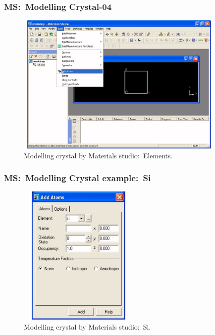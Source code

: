 \frame
{
	\frametitle{\textrm{MS:~Modelling Crystal-04}}
\begin{figure}[h!]
\centering
\vspace*{-0.10in}
\includegraphics[height=2.70in,width=4.00in,viewport=0 0 1090 759,clip]{Figures/MS-New_Project-09.png}
\caption{\tiny \textrm{Modelling crystal by Materials studio:~Elements.}}%
\label{MS-Modelling-Crystal-04}
\end{figure}
}

\frame
{
	\frametitle{\textrm{MS:~Modelling Crystal example:~Si}}
\begin{figure}[h!]
\centering
\vspace*{-0.10in}
\includegraphics[height=2.70in,width=2.30in,viewport=0 0 546 747,clip]{Figures/MS-New_Project-10-Si_example.png}
\caption{\tiny \textrm{Modelling crystal by Materials studio:~Si.}}%
\label{MS-Modelling-Crystal-05}
\end{figure}
}


